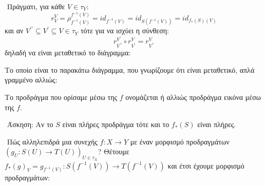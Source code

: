 $ $\newline
Πράγματι, για κάθε $V \in \tau_Y$:
$$r^V_V = \rho^{f^{-1}(V)}_{f^{-1}(V)} = id_{f^{-1}(V)} = id_{S(f^{-1}(V))} = id_{f_*(S)(V)}$$ και αν $V^{\prime\prime} \subseteq V^{\prime}\subseteq V \in \tau_Y$ τότε για να ισχύει η σύνθεση:
$$r^{V^{\prime}}_{V^{\prime\prime}} \circ r^V_{V^{\prime}} = r^V_{V^{\prime\prime}}$$ δηλαδή να είναι μεταθετικό το διάγραμμα:

\begin{figure}[H]
    \centering
\end{figure}

\noindent Το οποίο είναι το παρακάτω διάγραμμα, που γνωρίζουμε ότι είναι μεταθετικό, απλά γραμμένο αλλιώς:

\begin{figure}[H]
    \centering
\end{figure}

\noindent Το προδράγμα που ορίσαμε μέσω της $f$ ονομάζεται  ή αλλιώς προδράγμα εικόνα μέσω της $f$.

$ $\newline
Άσκηση: Αν το $S$ είναι πλήρες προδράγμα τότε και το  $f_*(S)$ είναι πλήρες.

$ $\newline
Πώς αλληλεπιδρά μια συνεχής $f:X\rightarrow Y$ με έναν μορφισμό προδραγμάτων $(g_U:S(U)\rightarrow T(U))_{U \in \tau_X}$? Θέτουμε $f_*(g)_V = g_{f^{-1}(V)} : S(f^{-1}(V)) \rightarrow T(f^{-1}(V))$ και έτσι έχουμε μορφισμό προδραγμάτων:

